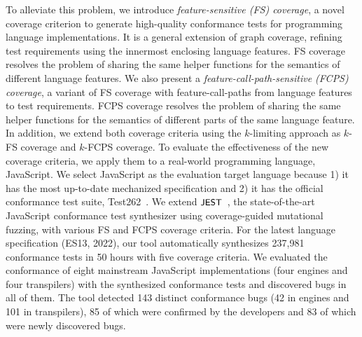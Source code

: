 \documentclass[acmsmall,review,screen]{acmart}
\newcommand{\name}[1]{\textsf{#1}}
\newcommand{\sname}[1]{\name{\small #1}}
\newcommand{\jest}{\sname{JEST}}
\begin{document}
To alleviate this problem, we introduce \textit{feature-sensitive (FS) coverage},
a novel coverage criterion to generate high-quality conformance tests for
programming language implementations. It is a general extension of graph coverage,
refining test requirements using the innermost enclosing language features.
FS coverage resolves the problem of sharing the same helper functions
for the semantics of different language features.
We also present a \textit{feature-call-path-sensitive (FCPS) coverage},
a variant of FS coverage with feature-call-paths from language features to test requirements.
FCPS coverage resolves the problem of sharing the same helper functions
for the semantics of different parts of the same language feature.
In addition, we extend both coverage criteria using the $k$-limiting approach as $k$-FS
coverage and $k$-FCPS coverage.
To evaluate the effectiveness of the new coverage criteria,
we apply them to a real-world programming language, JavaScript.
We select JavaScript as the evaluation target language because
1) it has the most up-to-date mechanized specification and
2) it has the official conformance test suite, Test262~\cite{test262}.
We extend $\jest$~\cite{jest}, the state-of-the-art JavaScript conformance test
synthesizer using coverage-guided mutational fuzzing, with various FS
and FCPS coverage criteria.
For the latest language specification (ES13, 2022), our tool automatically
synthesizes 237,981 conformance tests in 50 hours with five coverage criteria.
We evaluated the conformance of eight mainstream JavaScript implementations
(four engines and four transpilers) with the synthesized conformance tests
and discovered bugs in all of them.
The tool detected 143 distinct conformance bugs (42 in engines
and 101 in transpilers), 85 of which were confirmed by
the developers and 83 of which were newly discovered bugs.

\end{document}
